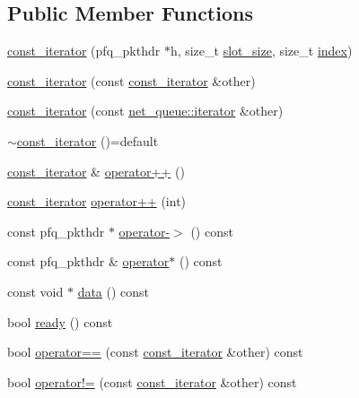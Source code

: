 \subsection*{Public Member Functions}
\begin{DoxyCompactItemize}
\item 
\hyperlink{structpfq_1_1net__queue_1_1const__iterator_adef1573899cd3f86946660ac3e1d4b0b}{const\+\_\+iterator} (pfq\+\_\+pkthdr $\ast$h, size\+\_\+t \hyperlink{classpfq_1_1net__queue_a9f745871293123f417a492aa861c13cc}{slot\+\_\+size}, size\+\_\+t \hyperlink{classpfq_1_1net__queue_ab33bdebd885e677a3e079c0193624e52}{index})
\item 
\hyperlink{structpfq_1_1net__queue_1_1const__iterator_a4ebcb8be6a56b2a132b5ecb6450a253f}{const\+\_\+iterator} (const \hyperlink{structpfq_1_1net__queue_1_1const__iterator}{const\+\_\+iterator} \&other)
\item 
\hyperlink{structpfq_1_1net__queue_1_1const__iterator_ad9eae4275472c07254d3d561a50cf5f0}{const\+\_\+iterator} (const \hyperlink{structpfq_1_1net__queue_1_1iterator}{net\+\_\+queue\+::iterator} \&other)
\item 
\hyperlink{structpfq_1_1net__queue_1_1const__iterator_ab5533378a3b4b5b9aa0f8b2b43f33cf5}{$\sim$const\+\_\+iterator} ()=default
\item 
\hyperlink{structpfq_1_1net__queue_1_1const__iterator}{const\+\_\+iterator} \& \hyperlink{structpfq_1_1net__queue_1_1const__iterator_a7f460bac19b566ae12820ba8e0aa476f}{operator++} ()
\item 
\hyperlink{structpfq_1_1net__queue_1_1const__iterator}{const\+\_\+iterator} \hyperlink{structpfq_1_1net__queue_1_1const__iterator_a7a38cf885fe28b63309e88c6d1d92b00}{operator++} (int)
\item 
const pfq\+\_\+pkthdr $\ast$ \hyperlink{structpfq_1_1net__queue_1_1const__iterator_a154fa18132e912b94dbc0fe431db1fb8}{operator-\/$>$} () const 
\item 
const pfq\+\_\+pkthdr \& \hyperlink{structpfq_1_1net__queue_1_1const__iterator_ab25c26084fba070d1de0663e580d60c2}{operator$\ast$} () const 
\item 
const void $\ast$ \hyperlink{structpfq_1_1net__queue_1_1const__iterator_ad0d7602ff14ed7fbf1f936d68bcd2420}{data} () const 
\item 
bool \hyperlink{structpfq_1_1net__queue_1_1const__iterator_a80b25aeb8f332fb175896c91f3a201c4}{ready} () const 
\item 
bool \hyperlink{structpfq_1_1net__queue_1_1const__iterator_ac717da0a9c4c7c1a09da97e60a203d9c}{operator==} (const \hyperlink{structpfq_1_1net__queue_1_1const__iterator}{const\+\_\+iterator} \&other) const 
\item 
bool \hyperlink{structpfq_1_1net__queue_1_1const__iterator_a87c0a1b95e317c487c0149855982cdcf}{operator!=} (const \hyperlink{structpfq_1_1net__queue_1_1const__iterator}{const\+\_\+iterator} \&other) const 
\end{DoxyCompactItemize}


